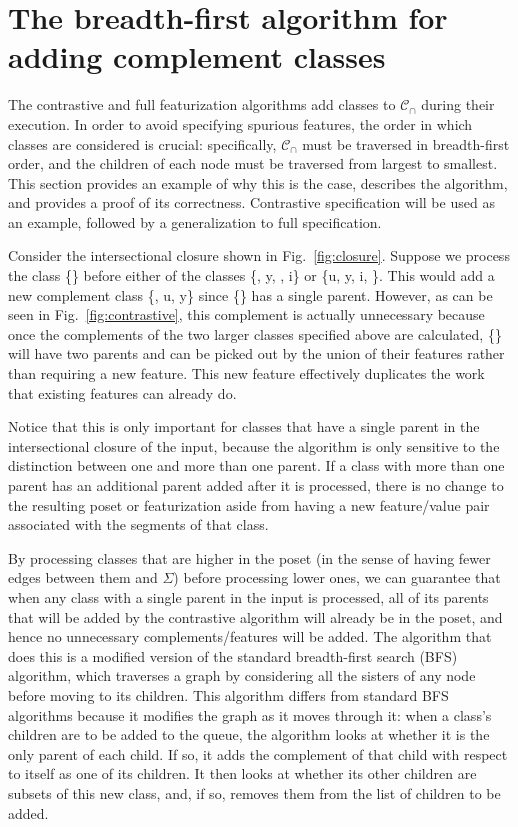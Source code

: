 \documentclass[11pt, oneside]{article}   	%
\begin{document}
\appendix

\section{The breadth-first algorithm for adding complement classes}

The contrastive and full featurization algorithms add classes to $\mathcal{C_\cap}$ during their execution. In order to avoid specifying spurious features, the order in which classes are considered is crucial: specifically, $\mathcal{C_\cap}$ must be traversed in breadth-first order, and the children of each node must be traversed from largest to smallest. This section provides an example of why this is the case, describes the algorithm, and provides a proof of its correctness. Contrastive specification will be used as an example, followed by a generalization to full specification.

Consider the intersectional closure shown in Fig.~\ref{fig:closure}. Suppose we process the class \{\} before either of the classes \{, y, , i\} or \{u, y, i, \}. This would add a new complement class \{, u, y\} since \{\} has a single parent. However, as can be seen in Fig.~\ref{fig:contrastive}, this complement is actually unnecessary because once the complements of the two larger classes specified above are calculated, \{\} will have two parents and can be picked out by the union of their features rather than requiring a new feature. This new feature effectively duplicates the work that existing features can already do.

Notice that this is only important for classes that have a single parent in the intersectional closure of the input, because the algorithm is only sensitive to the distinction between one and more than one parent. If a class with more than one parent has an additional parent added after it is processed, there is no change to the resulting poset or featurization aside from having a new feature/value pair associated with the segments of that class.

By processing classes that are higher in the poset (in the sense of having fewer edges between them and $\Sigma$) before processing lower ones, we can guarantee that when any class with a single parent in the input is processed, all of its parents that will be added by the contrastive algorithm will already be in the poset, and hence no unnecessary complements/features will be added. The algorithm that does this is a modified version of the standard breadth-first search (BFS) algorithm, which traverses a graph by considering all the sisters of any node before moving to its children. This algorithm differs from standard BFS algorithms because it modifies the graph as it moves through it: when a class's children are to be added to the queue, the algorithm looks at whether it is the only parent of each child. If so, it adds the complement of that child with respect to itself as one of its children. It then looks at whether its other children are subsets of this new class, and, if so, removes them from the list of children to be added.
\end{document}
